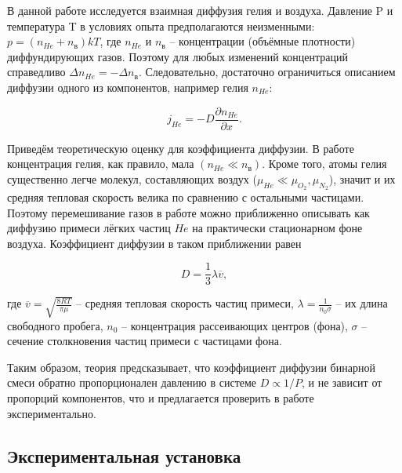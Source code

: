 \documentclass[a4paper,12pt]{article}
\theoremstyle{definition}
\begin{document}
	В данной работе исследуется взаимная диффузия гелия и воздуха. Давление P и температура T в условиях опыта предполагаются неизменными: $ p=(n_{He}+n_{\text{в}})kT $, где $ n_{He} $ и $ n_{\text{в}} $ -- концентрации (объёмные плотности) диффундирующих газов. Поэтому для любых изменений концентраций справедливо $ \Delta n_{He}=-\Delta n_{\text{в}} $. Следовательно, достаточно ограничиться описанием диффузии одного из компонентов, например гелия $ n_{He} $:
	
	\begin{equation}\label{1}
		j_{He}=-D\dfrac{\partial 	n_{He}}{\partial x}.
	\end{equation}
	
	Приведём теоретическую оценку для коэффициента диффузии. В работе концентрация гелия, как правило, мала $ (n_{He} \ll n_\text{в}) $. Кроме того, атомы гелия существенно легче молекул, составляющих воздух ($ \mu_{He} \ll \mu_{O_2}, \mu_{N_2} $), значит и их средняя тепловая скорость велика по сравнению с остальными частицами. Поэтому перемешивание газов в работе можно приближенно описывать как диффузию примеси лёгких частиц $ He $ на практически стационарном фоне воздуха. Коэффициент диффузии в таком приближении равен
	
	\begin{equation}\label{2}
		D=\dfrac{1}{3}\lambda 	\overline{v},
	\end{equation}
	
	где $ \overline{v}=\sqrt{\frac{8RT}{\pi \mu}} $ -- средняя тепловая скорость частиц примеси, $ \lambda = \frac{1}{n_0\sigma} $ -- их длина свободного пробега, $ n_0 $ -- концентрация рассеивающих центров (фона), $ \sigma $ -- сечение столкновения частиц примеси с частицами фона.
	
	Таким образом, теория предсказывает, что коэффициент диффузии бинарной смеси обратно пропорционален давлению в системе $ D \propto 1/P $, и не зависит от пропорций компонентов, что и предлагается проверить в работе экспериментально.
	
	\subsection*{Экспериментальная установка}
	
\end{document}
